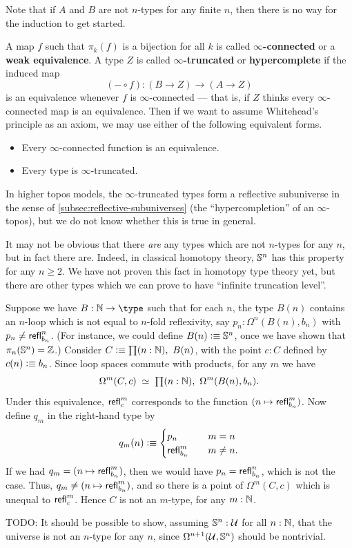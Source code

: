 Note that if $A$ and $B$ are not $n$-types for any finite $n$, then there is no way for the induction to get started.

A map $f$ such that $\pi_k(f)$ is a bijection for all $k$ is called \textbf{$\infty$-connected} or a \textbf{weak equivalence}.
A type $Z$ is called \textbf{$\infty$-truncated} or \textbf{hypercomplete} if the induced map
\[(-\circ f):(B\to Z) \to (A\to Z)\]
is an equivalence whenever $f$ is $\infty$-connected --- that is, if $Z$ thinks every $\infty$-connected map is an equivalence.
Then if we want to assume Whitehead's principle as an axiom, we may use either of the following equivalent forms.
\begin{itemize}
\item Every $\infty$-connected function is an equivalence.
\item Every type is $\infty$-truncated.
\end{itemize}
In higher topos models, the $\infty$-truncated types form a reflective subuniverse in the sense of \autoref{subsec:reflective-subuniverses} (the ``hypercompletion'' of an $\infty$-topos), but we do not know whether this is true in general.

It may not be obvious that there \emph{are} any types which are not $n$-types for any $n$, but in fact there are.
Indeed, in classical homotopy theory, $\mathbb{S}^n$ has this property for any $n\ge 2$.
We have not proven this fact in homotopy type theory yet, but there are other types which we can prove to have ``infinite truncation level''.

\begin{eg}
  Suppose we have $B:\nat\to\type$ such that for each $n$, the type $B(n)$ contains an $n$-loop which is not equal to $n$-fold reflexivity, say $p_n:\Omega^n(B(n),b_n)$ with $p_n \neq \mathsf{refl}_{b_n}^n$.
  (For instance, we could define $B(n)\vcentcolon\equiv \mathbb{S}^n$, once we have shown that $\pi_n(\mathbb{S}^n)=\mathbb{Z}$.)
  Consider $C\defeq \prd{n:\nat} B(n)$, with the point $c:C$ defined by $c(n)\vcentcolon\equiv b_n$.
  Since loop spaces commute with products, for any $m$ we have
  \[\eqvspaced{\Omega^m (C,c)}{\prd{n:\nat}\Omega^m(B(n),b_n)}.\]
  Under this equivalence, $\mathsf{refl}_{c}^m$ corresponds to the function $(n\mapsto \mathsf{refl}_{b_n}^m)$.
  Now define $q_m$ in the right-hand type by
  \[ q_m(n) \vcentcolon\equiv
  \begin{cases}
    p_n &\quad m=n\\
    \mathsf{refl}_{b_n}^m &\quad m\neq n.
  \end{cases}
  \]
  If we had $q_m = (n\mapsto \mathsf{refl}_{b_n}^m)$, then we would have $p_n = \mathsf{refl}_{b_n}^n$, which is not the case.
  Thus, $q_m \neq (n\mapsto \mathsf{refl}_{b_n}^m)$, and so there is a point of $\Omega^m(C,c)$ which is unequal to $\mathsf{refl}_{c}^m$.
  Hence $C$ is not an $m$-type, for any $m:\mathbb{N}$.
\end{eg}

\begin{eg}
  TODO: It should be possible to show, assuming $\mathbb{S}^n:\mathcal{U}$ for all $n:\mathbb{N}$, that the universe \UU is not an $n$-type for any $n$, since $\Omega^{n+1}(\mathcal{U},\mathbb{S}^n)$ should be nontrivial.
\end{eg}


